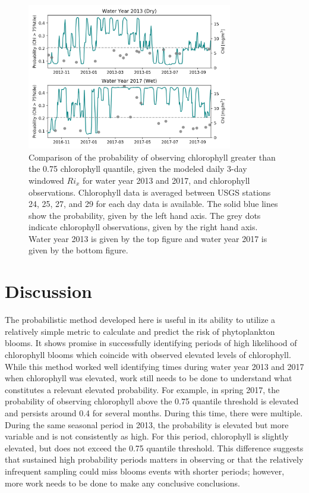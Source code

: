 \documentclass[preprint,review,12pt]{elsarticle}
\begin{document}
\begin{figure}[ht!]
\centering
\includegraphics[width=0.8\textwidth]{Figures/probobability_chl_comparison.png}
\caption{Comparison of the probability of observing chlorophyll greater than the 0.75 chlorophyll quantile, given the modeled daily 3-day windowed \(Ri_x\) for water year 2013 and 2017, and chlorophyll observations. Chlorophyll data is averaged between USGS stations 24, 25, 27, and 29 for each day data is available. The solid blue lines show the probability, given by the left hand axis. The grey dots indicate chlorophyll observations, given by the right hand axis. Water year 2013 is given by the top figure and water year 2017 is given by the bottom figure.}
\label{fig:chl_comp}
\end{figure}
\FloatBarrier

\section{Discussion}\label{S:discussion}
The probabilistic method developed here is useful in its ability to utilize a relatively simple metric to calculate and predict the risk of phytoplankton blooms. It shows promise in successfully identifying periods of high likelihood of chlorophyll blooms which coincide with observed elevated levels of chlorophyll. While this method worked well identifying times during water year 2013 and 2017 when chlorophyll was elevated, work still needs to be done to understand what constitutes a relevant elevated probability. For example, in spring 2017, the probability of observing chlorophyll above the 0.75 quantile threshold is elevated and persists around 0.4 for several months. During this time, there were multiple. During the same seasonal period in 2013, the probability is elevated but more variable and is not consistently as high. For this period, chlorophyll is slightly elevated, but does not exceed the 0.75 quantile threshold. This difference suggests that sustained high probability periods matters in observing or that the relatively infrequent sampling could miss blooms events with shorter periods; however, more work needs to be done to make any conclusive conclusions. 
\end{document}
